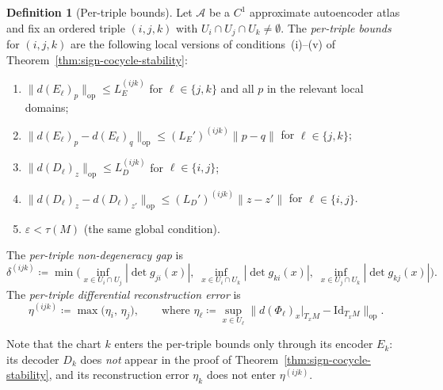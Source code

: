 \documentclass[11pt]{article}
\newcommand{\Id}{\mathrm{Id}}
\theoremstyle{plain}
\theoremstyle{definition}
\newtheorem{definition}[theorem]{Definition}
\theoremstyle{remark}
\begin{document}
\begin{definition}[Per-triple bounds]\label{def:per-triple}
Let $\mathcal{A}$ be a $C^1$ approximate autoencoder atlas and fix an ordered triple $(i, j, k)$ with $U_i \cap U_j \cap U_k \neq \emptyset$. The \emph{per-triple bounds} for $(i, j, k)$ are the following local versions of conditions~(i)--(v) of Theorem~\ref{thm:sign-cocycle-stability}:
\begin{enumerate}[label=(\roman*)$_{ijk}$]
    \item $\| d(E_\ell)_p \|_{\mathrm{op}} \leq L_E^{(ijk)}$ for $\ell \in \{j, k\}$ and all $p$ in the relevant local domains;
    \item $\| d(E_\ell)_p - d(E_\ell)_q \|_{\mathrm{op}} \leq (L_E')^{(ijk)} \|p - q\|$ for $\ell \in \{j, k\}$;
    \item $\| d(D_\ell)_z \|_{\mathrm{op}} \leq L_D^{(ijk)}$ for $\ell \in \{i, j\}$;
    \item $\| d(D_\ell)_z - d(D_\ell)_{z'} \|_{\mathrm{op}} \leq (L_D')^{(ijk)} \|z - z'\|$ for $\ell \in \{i, j\}$.
    \item[(v)$_{ijk}$] $\varepsilon < \tau(M)$ (the same global condition).
\end{enumerate}
The \emph{per-triple non-degeneracy gap} is
\[
\delta^{(ijk)} \coloneqq \min\!\bigl(\inf_{x \in U_i \cap U_j} |\det g_{ji}(x)|,\;\inf_{x \in U_i \cap U_k} |\det g_{ki}(x)|,\;\inf_{x \in U_j \cap U_k} |\det g_{kj}(x)|\bigr).
\]
The \emph{per-triple differential reconstruction error} is
\[
\eta^{(ijk)} \coloneqq \max\!\bigl(\eta_i,\, \eta_j\bigr),
\qquad \text{where } \eta_\ell \coloneqq \sup_{x \in U_\ell} \|d(\Phi_\ell)_x|_{T_xM} - \Id_{T_xM}\|_{\mathrm{op}}.
\]
\end{definition}

Note that the chart $k$ enters the per-triple bounds only through its encoder $E_k$: its decoder $D_k$ does \emph{not} appear in the proof of Theorem~\ref{thm:sign-cocycle-stability}, and its reconstruction error $\eta_k$ does not enter $\eta^{(ijk)}$.
\end{document}
